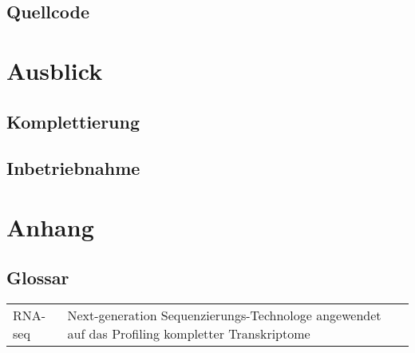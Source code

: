 \documentclass[a4paper]{thesis}
\begin{document}
\subsection{Quellcode}



\section{Ausblick}

\subsection{Komplettierung}

\subsection{Inbetriebnahme}

\section{Anhang}

\subsection{Glossar}

\begin{tabularx}{\textwidth}{lX}
	  RNA-seq
	& Next-generation Sequenzierungs-Technologe angewendet auf
          das Profiling kompletter Transkriptome
\\
\end{tabularx}
\end{document}
